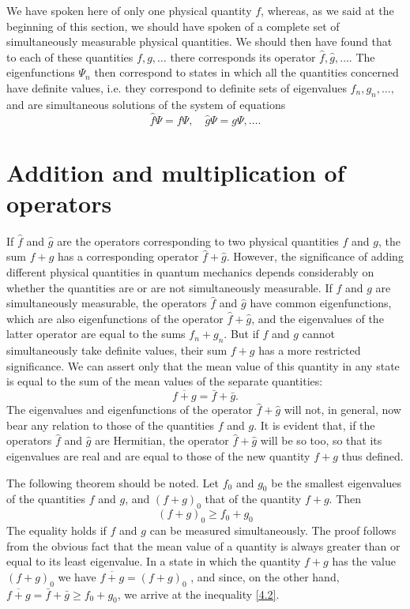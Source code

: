 We have spoken here of only one physical quantity $ f $, whereas, as we said at the beginning of this section, we should have spoken of a complete set of simultaneously measurable physical quantities. We should then have found that to each of these quantities $ f,g,\dots $ there corresponds its operator $ \hat{f},\hat{g},\dots $. The eigenfunctions $ \Psi_n $ then correspond to states in which all the quantities concerned have definite values, i.e. they correspond to definite sets of eigenvalues $ f_n, g_n,\dots, $ and are simultaneous solutions of the system of equations
\[ \hat{f}\Psi=f\Psi,\quad\hat{g}\Psi=g\Psi,\dots. \]



\section{Addition and multiplication of operators}\label{Addition and multiplication of operators}
If $ \hat{f} $ and $ \hat{g} $ are the operators corresponding to two physical quantities $ f $ and $ g $, the sum $ f+g $ has a corresponding operator $ \hat{f}+\hat{g} $. However, the significance of adding different physical quantities in quantum mechanics depends considerably on whether the quantities are or are not simultaneously measurable. If $ f $ and $ g $ are simultaneously measurable, the operators $ \hat{f} $ and $ \hat{g} $ have common eigenfunctions, which are also eigenfunctions of the operator $ \hat{f}+\hat{g} $, and the eigenvalues of the latter operator are equal to the sums $ f_n + g_n $. But if $ f $ and $ g $ cannot simultaneously take definite values, their sum $ f+g $ has a more restricted significance. We can assert only that the mean value of this quantity in any state is equal to the sum of the mean values of the separate quantities:
\begin{equation}\label{4.1}
\overline{f+g}=\bar{f}+\bar{g}.
\end{equation}
The eigenvalues and eigenfunctions of the operator $ \hat{f}+\hat{g} $ will not, in general, now bear any relation to those of the quantities $ f $ and $ g $. It is evident that, if the operators $ \hat{f} $ and $ \hat{g} $ are Hermitian, the operator $ \hat{f}+\hat{g} $ will be so too, so that its eigenvalues are real and are equal to those of the new quantity $ f + g $ thus defined.

The following theorem should be noted. Let $ f_0 $ and $ g_0 $ be the smallest eigenvalues of the quantities $ f $ and $ g $, and $ (f+g)_0 $ that of the quantity $ f+g $. Then
\begin{equation}\label{4.2}
(f+g)_0\geqslant f_0+g_0
\end{equation}
The equality holds if $ f $ and $ g $ can be measured simultaneously. The proof follows from the obvious fact that the mean value of a quantity is always greater than or equal to its least eigenvalue. In a state in which the quantity $ f+g $ has the value $ (f+g)_0 $ we have $ \overline{f+g}=(f+g)_0 $ , and since, on the other hand, $ \overline{f+g}=\bar{f}+\bar{g}\geqslant f_0+g_0 $, we arrive at the inequality \eqref{4.2}.


